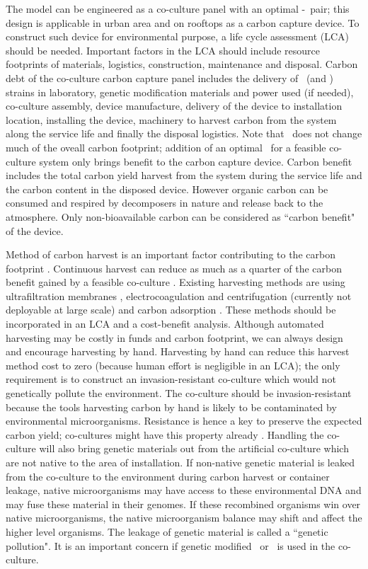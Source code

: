 \documentclass[../thesis.tex]{subfiles} %
\begin{document}
The model can be engineered as a co-culture panel with an optimal \phy-\bac\ pair; this design is applicable in urban area and on rooftops as a carbon capture device.  To construct such device for environmental purpose, a life cycle assessment (LCA) should be needed.  Important factors in the LCA should include resource footprints of materials, logistics, construction, maintenance and disposal.  Carbon debt of the co-culture carbon capture panel includes the delivery of \phy\ (and \bac) strains in laboratory, genetic modification materials and power used (if needed), co-culture assembly, device manufacture, delivery of the device to installation location, installing the device, machinery to harvest carbon from the system along the service life and finally the disposal logistics.  Note that \bac\ does not change much of the oveall carbon footprint; addition of an optimal \bac\ for a feasible co-culture system only brings benefit to the carbon capture device.  Carbon benefit includes the total carbon yield harvest from the system during the service life and the carbon content in the disposed device.  However organic carbon can be consumed and respired by decomposers in nature and release back to the atmosphere.  Only non-bioavailable carbon can be considered as ``carbon benefit" of the device.

Method of carbon harvest is an important factor contributing to the carbon footprint \autocite{fuentes2016impact}.  Continuous harvest can reduce as much as a quarter of the carbon benefit gained by a feasible co-culture \autocite{mata2010microalgae}.  Existing harvesting methods are using ultrafiltration membranes \autocite{zhang2010harvesting}, electrocoagulation and centrifugation (currently not deployable at large scale) \autocite{wijffels2010outlook} and carbon adsorption \autocite{mata2010microalgae,wang2012novel,lee2014repeated}.  These methods should be incorporated in an LCA and a cost-benefit analysis.  Although automated harvesting may be costly in funds and carbon footprint, we can always design and encourage harvesting by hand.  Harvesting by hand can reduce this harvest method cost to zero (because human effort is negligible in an LCA); the only requirement is to construct an invasion-resistant co-culture which would not genetically pollute the environment.  The co-culture should be invasion-resistant because the tools harvesting carbon by hand is likely to be contaminated by environmental microorganisms.  Resistance is hence a key to preserve the expected carbon yield; co-cultures might have this property already \autocite{fuentes2016impact,seyedsayamdost2011roseobacticides}.  Handling the co-culture will also bring genetic materials out from the artificial co-culture which are not native to the area of installation.  If non-native genetic material is leaked from the co-culture to the environment during carbon harvest or container leakage, native microorganisms may have access to these environmental DNA and may fuse these material in their genomes.  If these recombined organisms win over native microorganisms, the native microorganism balance may shift and affect the higher level organisms.  The leakage of genetic material is called a ``genetic pollution".  It is an important concern if genetic modified \phy\ or \bac\ is used in the co-culture.
\end{document}
